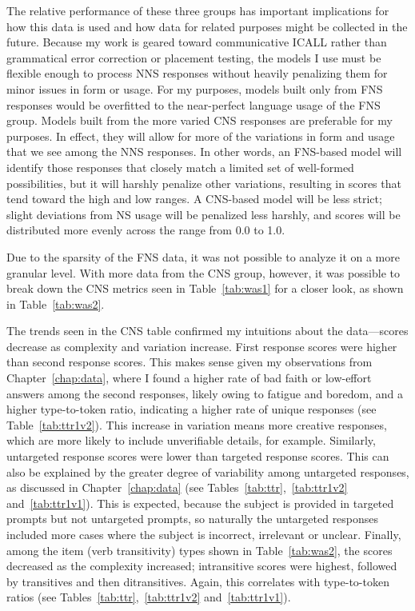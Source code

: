 The relative performance of these three groups has important implications for how this data is used and how data for related purposes might be collected in the future. Because my work is geared toward communicative ICALL rather than grammatical error correction or placement testing, the models I use must be flexible enough to process NNS responses without heavily penalizing them for minor issues in form or usage. For my purposes, models built only from FNS responses would be overfitted to the near-perfect language usage of the FNS group. Models built from the more varied CNS responses are preferable for my purposes. In effect, they will allow for more of the variations in form and usage that we see among the NNS responses. In other words, an FNS-based model will identify those responses that closely match a limited set of well-formed possibilities, but it will harshly penalize other variations, resulting in scores that tend toward the high and low ranges. A CNS-based model will be less strict; slight deviations from NS usage will be penalized less harshly, and scores will be distributed more evenly across the range from 0.0 to 1.0.

Due to the sparsity of the FNS data, it was not possible to analyze it on a more granular level. With more data from the CNS group, however, it was possible to break down the CNS metrics seen in Table~\ref{tab:was1} for a closer look, as shown in Table~\ref{tab:was2}.

The trends seen in the CNS table confirmed my intuitions about the data---scores decrease as complexity and variation increase. First response scores were higher than second response scores. This makes sense given my observations from Chapter~\ref{chap:data}, where I found a higher rate of bad faith or low-effort answers among the second responses, likely owing to fatigue and boredom, and a higher type-to-token ratio, indicating a higher rate of unique responses (see Table~\ref{tab:ttr1v2}). This increase in variation means more creative responses, which are more likely to include unverifiable details, for example. Similarly, untargeted response scores were lower than targeted response scores. This can also be explained by the greater degree of variability among untargeted responses, as discussed in Chapter~\ref{chap:data} (see Tables~\ref{tab:ttr},~\ref{tab:ttr1v2} and~\ref{tab:ttr1v1}). This is expected, because the subject is provided in targeted prompts but not untargeted prompts, so naturally the untargeted responses included more cases where the subject is incorrect, irrelevant or unclear. Finally, among the item (verb transitivity) types shown in Table~\ref{tab:was2}, the scores decreased as the complexity increased; intransitive scores were highest, followed by transitives and then ditransitives. Again, this correlates with type-to-token ratios (see Tables~\ref{tab:ttr},~\ref{tab:ttr1v2} and~\ref{tab:ttr1v1}). 

